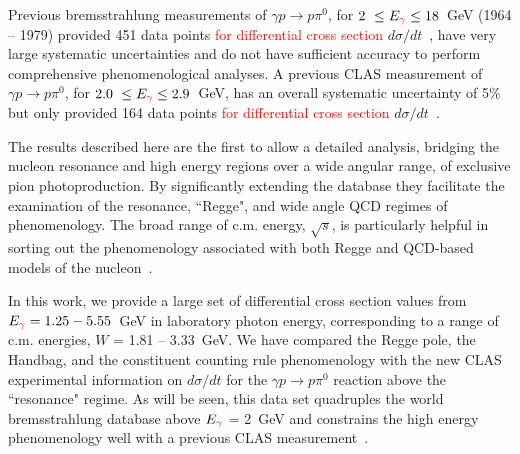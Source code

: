 \documentclass[aps,prc,twocolumn,floatfix,showpacs,preprintnumbers,amsmath,amssymb,superscriptaddress,linenumbers]{revtex4-1}
\begin{document}
Previous bremsstrahlung measurements of $\gamma p\rightarrow p\pi^0$, for $2~\leq E_{\textcolor{red}{\gamma}} \leq 
18$~GeV (1964 -- 1979) provided 451 data points \textcolor{red}{for differential cross section} $d\sigma/dt$~\cite{brem}, have very large systematic 
uncertainties and do not have sufficient accuracy to perform 
comprehensive phenomenological analyses.  A previous CLAS measurement of $\gamma p\rightarrow p\pi^0$, for $2.0~\leq E_{\textcolor{red}{\gamma}} \leq 2.9$~GeV, has an overall systematic uncertainty of 5\% but only provided 164 data points \textcolor{red}{for differential cross section} $d\sigma/dt$~\cite{Dugger:2007bt}.

The results described here are the first to allow a detailed analysis, bridging the nucleon resonance and high energy regions over a wide angular range, of exclusive pion photoproduction. By significantly extending the database they facilitate
the examination
%		 
		of the resonance, ``Regge", and wide angle QCD regimes of phenomenology. The 
		broad range of c.m. energy, $\sqrt{s}$, is particularly helpful in 
		sorting out the phenomenology associated with both Regge and QCD-based 
		models of the nucleon~\cite{Kroll:2017hym}.

In this work, we provide a large set of differential 
cross section values from $E_{\textcolor{red}{\gamma}} = 1.25-5.55$~GeV in laboratory photon 
energy, corresponding to a range of c.m. energies, $W$ = 1.81 -- 
3.33~GeV.  We have compared the Regge pole, the Handbag, and the 
constituent counting rule phenomenology with the new CLAS experimental 
information on $d\sigma/dt$ for the $\gamma p\rightarrow  p\pi^0$ 
reaction above the ``resonance" regime. As will be seen, this data 
set quadruples the world bremsstrahlung database above $E_{\textcolor{red}{\gamma}}$ = 2~GeV and 
constrains the high energy phenomenology well with a previous CLAS 
measurement~\cite{Dugger:2007bt}.

\end{document}
